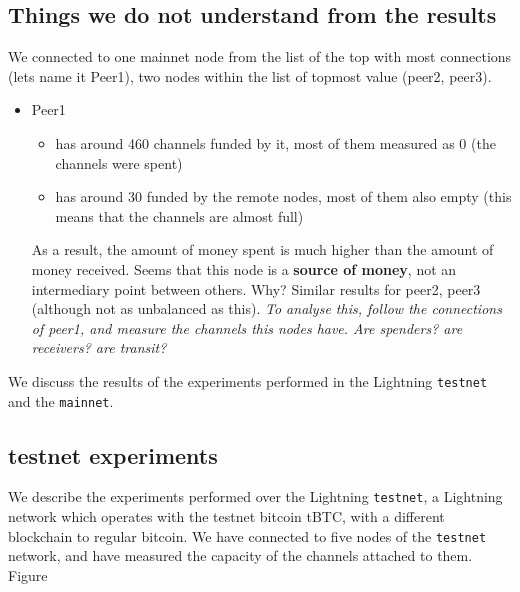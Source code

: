 \subsection{Things we do not understand from the results}
We connected to one mainnet node from the list of the top with most connections (lets name it Peer1), two nodes within the list of topmost value (peer2, peer3).
\begin{itemize}
\item Peer1 
    \begin{itemize}
    \item  has around 460 channels funded by it, most of them measured as 0 (the channels were spent)
    \item has around 30 funded by the remote nodes, most of them also empty (this means that the channels are almost full)
    \end{itemize}
    As a result, the amount of money spent is much higher than the amount of money received. Seems that this node is a \textbf{source of money}, not an intermediary point between others. Why?
    Similar results for peer2, peer3 (although not as unbalanced as this).
    \textit{To analyse this, follow the connections of peer1, and measure the channels this nodes have. Are spenders? are receivers? are transit?}
   
\end{itemize}



We discuss the results of the experiments performed in the Lightning \texttt{testnet} and 
the \texttt{mainnet}.

\subsection{testnet experiments}

We describe the experiments performed over the Lightning \texttt{testnet}, a Lightning network which operates with the 
testnet bitcoin tBTC, with a different blockchain to regular bitcoin.
We have connected to five nodes of the \texttt{testnet} network, and have measured the  capacity of the channels attached to them. 
Figure~\cite{fig:testnet_absolute_both_directions} 


